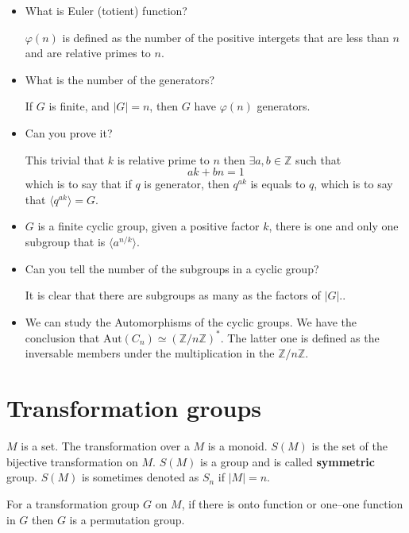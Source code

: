 \documentclass[../main.tex]{subfiles}
\begin{document}
\begin{itemize}
	\item  What is Euler (totient) function?

		\( \varphi (n)\) is defined as the number of the positive intergets that are less than \(n\) and are relative primes to \(n\).
	\item 
		What is the number of the generators? 

		If \(G\) is finite, and \(\vert G \vert = n\), then \(G\) 
		have \( \varphi (n)\) generators. 

	\item 
		Can you prove it? 

		This trivial that \(k\) is relative prime to \(n\) then \(\exists a , b  \in \mathbb{Z}\) such that 
		\[
			a k + b n  = 1
		\]
		which is to say that if \(q\) is generator, then \( q ^{ ak}\) is equals to \(q\), which is to say that \(\langle q ^{ak} \rangle = G\). 
	\item  
		\(G\) is a finite cyclic group, given a positive factor \(k\), there is one and only one subgroup that is \( \langle a ^{n / k} \rangle\).
	\item Can you tell the number of the subgroups in a cyclic group?

		It is clear that there are subgroups as many as the factors of 
		\(\vert G \vert\)..

	\item
		We can study the Automorphisms of the cyclic groups. We have the conclusion that \( \text{Aut} (C_{n}) \simeq (\mathbb{Z}/ n \mathbb{Z} ) ^{*}\). The latter one is defined as the inversable members under the multiplication in the \(\mathbb{Z}/ n\mathbb{Z}\).


\end{itemize}

\section{Transformation groups}
\label{sec:Transformation groups}

\(M\) is a set. The transformation over a \(M\) is a monoid. \(S (M)\) is the set of the bijective transformation on \(M\). \(S (M)\) is a group and is called \textbf{symmetric} group. \(S (M)\) is sometimes denoted as \( S_{n}\) if \(\vert M \vert = n\). 

\begin{thm}
	For a transformation group \(G\) on \(M\), if there is onto function or one--one function in \(G\) then \(G\) is a permutation group.
\end{thm}
\end{document}

